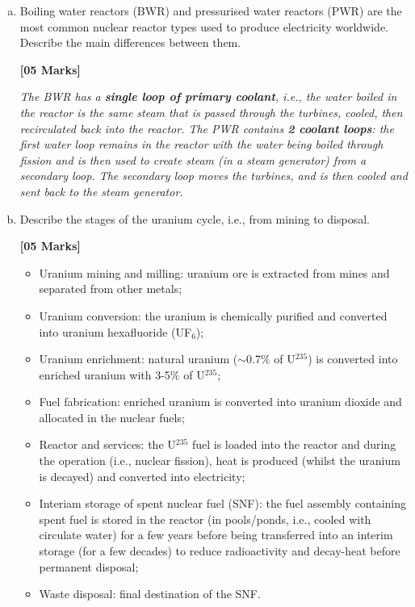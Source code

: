 \documentclass[calculator,refrigeranttables,steamtables,datasheet]{exam}
\begin{document}
\begin{question}

\begin{enumerate}[(a)]
\item Boiling water reactors (BWR) and pressurised water reactors (PWR) are the most common nuclear reactor types used to produce electricity worldwide. Describe the main differences between them.
\begin{flushright}
{\bf [05 Marks]}
\end{flushright}
\medskip

{\it The BWR has a {\bf single loop of primary coolant}, i.e., the water boiled in the reactor is the same steam that is passed through the turbines, cooled, then recirculated back into the reactor. The PWR contains {\bf 2 coolant loops}: the first water loop remains in the reactor with the water being boiled through fission and is then used to create steam (in a steam generator) from a secondary loop.  The secondary loop moves the turbines, and is then cooled and sent back to the steam generator. }

\medskip


\item Describe the stages of the uranium cycle, i.e., from mining to disposal. 
\begin{flushright}
{\bf [05 Marks]}
\end{flushright}

\medskip
{\it
\begin{itemize}
\item Uranium mining and milling: uranium ore is extracted from mines and separated from other metals;
\item Uranium conversion: the uranium is chemically purified and converted into uranium hexafluoride (UF$_{6}$);
\item Uranium enrichment: natural uranium ($\sim$0.7$\%$ of U$^{235}$) is converted into enriched uranium with 3-5$\%$ of U$^{235}$;
\item Fuel fabrication: enriched uranium is converted into uranium dioxide and allocated in the nuclear fuels;
\item Reactor and services: the U$^{235}$ fuel is loaded into the reactor and during the operation (i.e., nuclear fission), heat is produced (whilst the uranium is decayed) and converted into electricity;
\item Interiam storage of spent nuclear fuel (SNF): the fuel assembly containing spent fuel is stored in the reactor (in pools/ponds, i.e., cooled with circulate water) for a few years before being transferred into an interim storage (for a few decades) to reduce radioactivity and decay-heat before permanent disposal;
\item Waste disposal: final destination of the SNF.  


\end{itemize}}
\end{enumerate}
\end{question}
\end{document}
